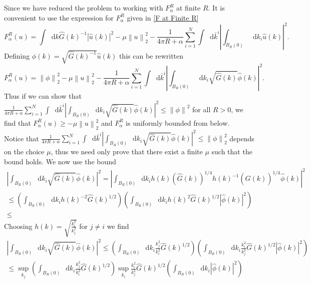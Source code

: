 \documentclass[a4paper,11pt]{article}
\newcommand{\norm}[1]{\left\lVert #1 \right\rVert}
\newcommand{\abs}[1]{\left\lvert #1 \right\rvert}
\newcommand*\diff{\mathop{}\!\mathrm{d}}
\numberwithin{equation}{section}
\begin{document}
Since we have reduced the problem to working with $ F^R_\alpha $ at finite $ R $. It is convenient to use the expression for $ F_\alpha^R $ given in \eqref{F at Finite R}
\begin{equation}
F_\alpha^R(u)=\int\diff k \hat{G}(k)^{-1}\abs{\hat{u}(k)}^2-\mu\norm{u}_2^2-\frac{1}{4\pi R+\alpha}\sum_{i=1}^{N}\int\diff\bar{k}^i\left\lvert\int_{B_R(0)}\diff k_i\hat{u}(k)\right\rvert^2.
\end{equation}
Defining $ \hat{\phi}(k)=\sqrt{\hat{G}(k)^{-1}}\hat{u}(k) $ this can be rewritten\begin{equation}
F_\alpha^R(u)=\norm{\phi}_2^2-\mu\norm{u}_2^2-\frac{1}{4\pi R+\alpha}\sum_{i=1}^{N}\int\diff\bar{k}^i\left\lvert\int_{B_R(0)}\diff k_i\sqrt{\hat{G}(k)}\hat{\phi}(k)\right\rvert^2.
\end{equation}
Thus if we can show that $ \frac{1}{4\pi R+\alpha}\sum_{i=1}^{N}\int\diff\bar{k}^i\left\lvert\int_{B_R(0)}\diff k_i\sqrt{\hat{G}(k)}\hat{\phi}(k)\right\rvert^2\leq\norm{\phi}^2 $ for all $ R>0 $, we find that $ F_\alpha^R(u)\geq-\mu\norm{u}_2^2 $ and $ F_\alpha^R $ is uniformly bounded from below. \\Notice that $ \frac{1}{4\pi R+\alpha}\sum_{i=1}^{N}\int\diff\bar{k}^i\left\lvert\int_{B_R(0)}\diff k_i\sqrt{\hat{G}(k)}\hat{\phi}(k)\right\rvert^2\leq\norm{\phi}_2^2$ depends on the choice $ \mu $, thus we need only prove that there exist a finite $ \mu $ such that the bound holds. We now use the bound \begin{equation}
\begin{aligned}
\left\lvert\int_{B_R(0)}\diff k_i\sqrt{\hat{G}(k)}\hat{\phi}(k)\right\rvert^2=\left\lvert\int_{B_R(0)}\diff k_ih(k)\left(\hat{G}(k)\right)^{1/4}h(k)^{-1}\left(\hat{G}(k)\right)^{1/4}\hat{\phi}(k)\right\rvert^2\\
\leq \left(\int_{B_R(0)}\diff k_ih(k)^{-2}\hat{G}(k)^{1/2}\right)\left(\int_{B_R(0)}\diff k_i h(k)^{2}\hat{G}(k)^{1/2}\abs{\hat{\phi}(k)}^2\right)\\
\leq 
\end{aligned}
\end{equation}
Choosing $ h(k)=\sqrt{\frac{k_i^2}{k_j^2}} $ for $ j\neq i $ we find
\begin{equation}
\begin{aligned}
\left\lvert\int_{B_R(0)}\diff k_i\sqrt{\hat{G}(k)}\hat{\phi}(k)\right\rvert^2
\leq \left(\int_{B_R(0)}\diff k_i\frac{k_j^2}{k_i^2}\hat{G}(k)^{1/2}\right)\left(\int_{B_R(0)}\diff k_i \frac{k_i^2}{k_j^2}\hat{G}(k)^{1/2}\abs{\hat{\phi}(k)}^2\right)\\
\leq \sup_{k_j}\left(\int_{B_R(0)}\diff k_i\frac{k_j^2}{k_i^2}\hat{G}(k)^{1/2}\right)\sup_{k_i}\frac{k_i^2}{k_j^2}\hat{G}(k)^{1/2}\left(\int_{B_R(0)}\diff k_i \abs{\hat{\phi}(k)}^2\right)
\end{aligned}
\end{equation}
\end{document}
